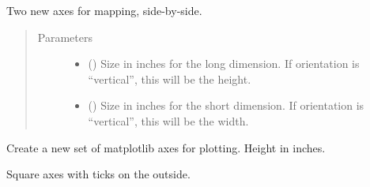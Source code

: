 \documentclass[letterpaper,10pt,english]{sphinxmanual}
\begin{document}
\begin{fulllineitems}
\label{\detokenize{xanespy:xanespy.plots.dual_axes}}
Two new axes for mapping, side-by-side.
\begin{quote}\begin{description}
\item[{Parameters}] \leavevmode\begin{itemize}
\item {} 
 () \textendash{} Size in inches for the long dimension. If orientation is
“vertical”, this will be the height.

\item {} 
 () \textendash{} Size in inches for the short dimension. If orientation is
“vertical”, this will be the width.

\end{itemize}

\end{description}\end{quote}

\end{fulllineitems}


\begin{fulllineitems}
\label{\detokenize{xanespy:xanespy.plots.new_axes}}
Create a new set of matplotlib axes for plotting. Height in inches.

\end{fulllineitems}


\begin{fulllineitems}
\label{\detokenize{xanespy:xanespy.plots.new_image_axes}}
Square axes with ticks on the outside.

\end{fulllineitems}

\end{document}
